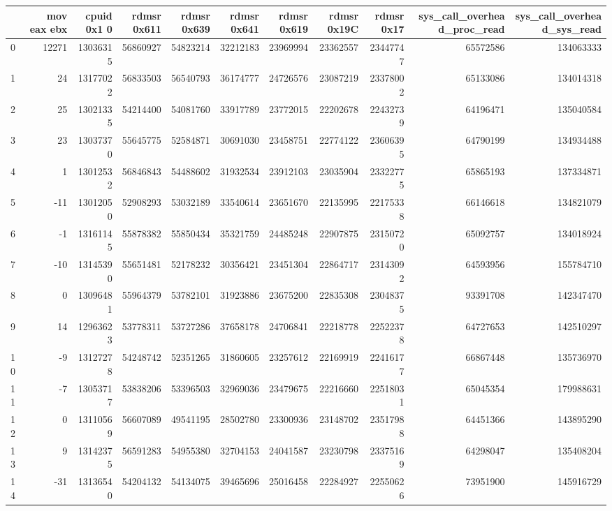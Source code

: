 \begin{tabular}{lrrrrrrrrrr}
\toprule
 & mov eax ebx & cpuid 0x1 0 & rdmsr 0x611 & rdmsr 0x639 & rdmsr 0x641 & rdmsr 0x619 & rdmsr 0x19C & rdmsr 0x17 & sys_call_overhead_proc_read & sys_call_overhead_sys_read \\
\midrule
0 & 12271 & 13036315 & 56860927 & 54823214 & 32212183 & 23969994 & 23362557 & 23447747 & 65572586 & 134063333 \\
1 & 24 & 13177022 & 56833503 & 56540793 & 36174777 & 24726576 & 23087219 & 23378002 & 65133086 & 134014318 \\
2 & 25 & 13021335 & 54214400 & 54081760 & 33917789 & 23772015 & 22202678 & 22432739 & 64196471 & 135040584 \\
3 & 23 & 13037370 & 55645775 & 52584871 & 30691030 & 23458751 & 22774122 & 23606395 & 64790199 & 134934488 \\
4 & 1 & 13012532 & 56846843 & 54488602 & 31932534 & 23912103 & 23035904 & 23322775 & 65865193 & 137334871 \\
5 & -11 & 13012050 & 52908293 & 53032189 & 33540614 & 23651670 & 22135995 & 22175338 & 66146618 & 134821079 \\
6 & -1 & 13161145 & 55878382 & 55850434 & 35321759 & 24485248 & 22907875 & 23150720 & 65092757 & 134018924 \\
7 & -10 & 13145390 & 55651481 & 52178232 & 30356421 & 23451304 & 22864717 & 23143092 & 64593956 & 155784710 \\
8 & 0 & 13096481 & 55964379 & 53782101 & 31923886 & 23675200 & 22835308 & 23048375 & 93391708 & 142347470 \\
9 & 14 & 12963623 & 53778311 & 53727286 & 37658178 & 24706841 & 22218778 & 22522378 & 64727653 & 142510297 \\
10 & -9 & 13127278 & 54248742 & 52351265 & 31860605 & 23257612 & 22169919 & 22416177 & 66867448 & 135736970 \\
11 & -7 & 13053717 & 53838206 & 53396503 & 32969036 & 23479675 & 22216660 & 22518031 & 65045354 & 179988631 \\
12 & 0 & 13110569 & 56607089 & 49541195 & 28502780 & 23300936 & 23148702 & 23517988 & 64451366 & 143895290 \\
13 & 9 & 13142375 & 56591283 & 54955380 & 32704153 & 24041587 & 23230798 & 23375169 & 64298047 & 135408204 \\
14 & -31 & 13136540 & 54204132 & 54134075 & 39465696 & 25016458 & 22284927 & 22550626 & 73951900 & 145916729 \\
\bottomrule
\end{tabular}
